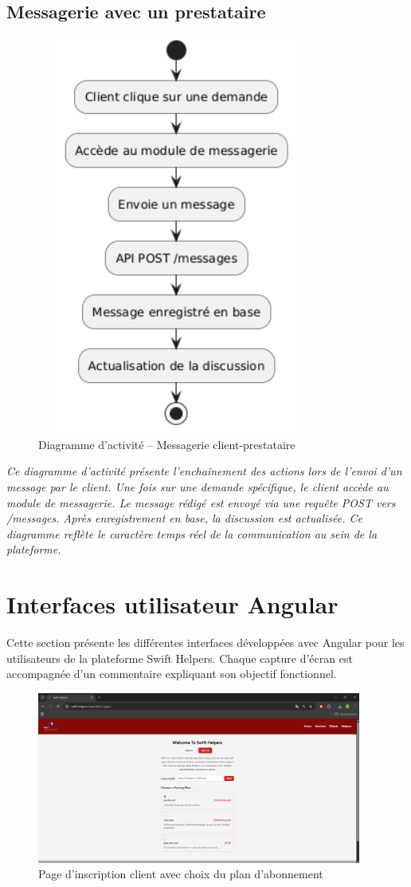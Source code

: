 \subsection*{Messagerie avec un prestataire}
\begin{figure}[H]
\centering
\includegraphics[width=0.55\linewidth]{figures/Activité – Messagerie avec prestataire.png}
\caption{Diagramme d’activité – Messagerie client-prestataire}
\end{figure}
\textit{Ce diagramme d’activité présente l’enchaînement des actions lors de l’envoi d’un message par le client. Une fois sur une demande spécifique, le client accède au module de messagerie. Le message rédigé est envoyé via une requête POST vers /messages. Après enregistrement en base, la discussion est actualisée. Ce diagramme reflète le caractère temps réel de la communication au sein de la plateforme.}
\section{Interfaces utilisateur Angular}

Cette section présente les différentes interfaces développées avec Angular pour les utilisateurs de la plateforme Swift Helpers. Chaque capture d’écran est accompagnée d’un commentaire expliquant son objectif fonctionnel.

\begin{figure}[H]
    \centering
    \includegraphics[width=0.95\textwidth]{figures/gestion de compte client.png}
    \caption{Page d'inscription client avec choix du plan d'abonnement}
\end{figure}

